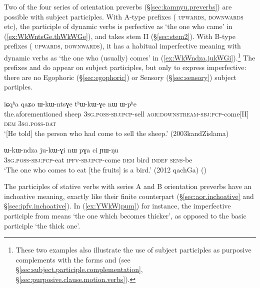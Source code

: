 Two of the four series of orientation preverbs (§\ref{sec:kamnyu.preverbs}) are possible with subject participles. With A-type prefixes ( \textsc{upwards},  \textsc{downwards} etc), the participle of dynamic verbs is perfective as  `the one who came' in (\ref{ex:WkWntsGe.thWkWGe}), and takes stem II (§\ref{sec:stem2}). With B-type prefixes ( \textsc{upwards},  \textsc{downwards}), it has a habitual imperfective meaning with dynamic verbs as  `the one who (usually) comes' in (\ref{ex:WkWndza.jukWGi}).\footnote{These two examples also illustrate the use of subject participles as purposive complements with the forms  and  (see §\ref{sec:subject.participle.complementation}, §\ref{sec:purposive.clause.motion.verbs}).} The prefixes and  do appear on subject participles, but only to express imperfective: there are no Egophoric (§\ref{sec:egophoric}) or Sensory (§\ref{sec:sensory}) subject partiples.

\begin{exe}
\ex \label{ex:WkWntsGe.thWkWGe}
\gll iɕqʰa qaʑo ɯ-kɯ-ntsɣe tʰɯ-kɯ-ɣe nɯ ɯ-pʰe \\
the.aforementioned sheep \textsc{3sg}.\textsc{poss}-\textsc{sbj}:\textsc{pcp}-sell \textsc{aor}:\textsc{downstream}-\textsc{sbj}:\textsc{pcp}-come[II] \textsc{dem} \textsc{3sg}.\textsc{poss}-\textsc{dat} \\
\glt  `[He told] the person who had come to sell the sheep.' (2003kandZislama)
\end{exe}

\begin{exe}
\ex \label{ex:WkWndza.jukWGi}
\gll ɯ-kɯ-ndza ju-kɯ-ɣi nɯ pɣa ci ɲɯ-ŋu \\
\textsc{3sg}.\textsc{poss}-\textsc{sbj}:\textsc{pcp}-eat \textsc{ipfv}-\textsc{sbj}:\textsc{pcp}-come \textsc{dem} bird \textsc{indef} \textsc{sens}-be \\
\glt   `The one who comes to eat [the fruits] is a bird.' (2012 qachGa)
()
\end{exe}

The participles of stative verbs with series A and B orientation preverbs have an inchoative meaning, exactly like their finite counterpart (§\ref{sec:aor.inchoative} and §\ref{sec:ipfv.inchoative}).  In (\ref{ex:YWkWjpum}) for instance, the imperfective participle  from  means `the one which becomes thicker', as opposed to the basic participle  `the thick one'.

